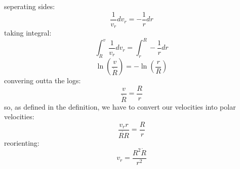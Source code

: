 seperating sides:
\begin{equation}
    \frac{1}{v_r}dv_r = - \frac{1}{r}dr
\end{equation}
taking integral:
\begin{equation}
    \int_{\dot{R}}^{v}\frac{1}{v_r}dv_r = \int_r^R-\frac{1}{r}dr
\end{equation}
\begin{equation}
    \ln(\frac{v}{\dot{R}}) = - \ln(\frac{r}{R}) 
\end{equation}
convering outta the logs:
\begin{equation}
    \frac{v}{\dot{R}} = \frac{R}{r}
\end{equation}
so, as defined in the definition, we have to convert our velocities into polar velocities:
\begin{equation}
     \frac{v_rr}{\dot{RR}} = \frac{R}{r}
\end{equation}
reorienting:
\begin{equation}
    \boxed{v_r = \frac{R^2\dot{R}}{r^2}}
\end{equation}


\medskip
